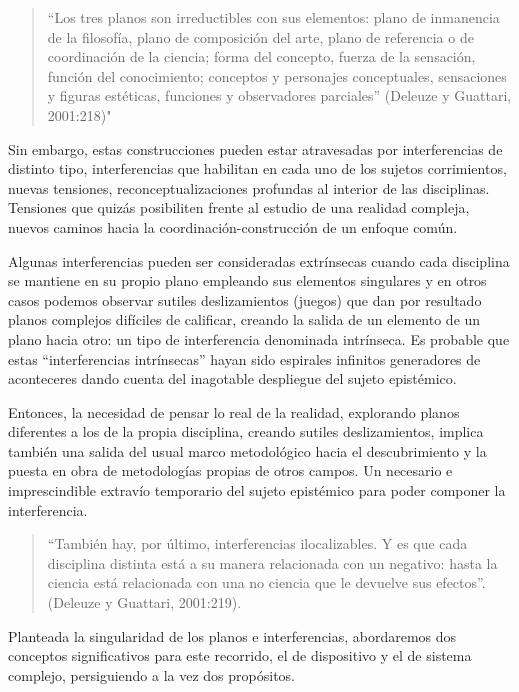 \begin{quote}
       “Los tres planos son irreductibles con sus elementos: plano de inmanencia
       de la filosofía, plano de composición del arte, plano de referencia o de
       coordinación de la ciencia; forma del concepto, fuerza de la sensación,
       función del conocimiento; conceptos y personajes conceptuales,
       sensaciones y figuras estéticas, funciones y observadores
       parciales” (Deleuze y Guattari, 2001:218)"
\end{quote} 

Sin embargo, estas construcciones pueden estar atravesadas por interferencias de
distinto tipo, interferencias que habilitan en cada uno de los sujetos   
corrimientos, nuevas  tensiones, reconceptualizaciones profundas al interior
de las disciplinas. Tensiones que quizás posibiliten frente al estudio de una
realidad compleja, nuevos caminos hacia la coordinación-construcción de un
enfoque común.

Algunas interferencias pueden ser consideradas extrínsecas cuando
cada disciplina se mantiene en su propio plano empleando sus elementos
singulares y en otros casos podemos observar sutiles deslizamientos
(juegos) que dan por resultado planos complejos difíciles de calificar,
creando la salida de un elemento de un plano hacia otro: un tipo de
interferencia denominada intrínseca. Es probable que estas “interferencias
intrínsecas” hayan sido espirales infinitos generadores de aconteceres
dando cuenta del inagotable despliegue del sujeto epistémico.

Entonces, la necesidad de pensar lo real de la realidad, explorando
planos diferentes a los  de  la  propia   disciplina,  creando   sutiles
deslizamientos, implica también una salida del usual marco metodológico
hacia el descubrimiento y la puesta en obra de metodologías propias de
otros campos. Un necesario e imprescindible extravío temporario del
sujeto epistémico para poder componer la interferencia.

    \begin{quote}
      “También hay, por último, interferencias ilocalizables. Y es que cada
      disciplina distinta está a su manera relacionada con un negativo: hasta la
      ciencia está relacionada con una no ciencia que le devuelve sus efectos”.
      (Deleuze y Guattari, 2001:219).        
    \end{quote} 

Planteada la singularidad de los planos e interferencias, abordaremos
dos conceptos significativos para este recorrido, el de dispositivo y el
de sistema complejo, persiguiendo a la vez dos propósitos.

